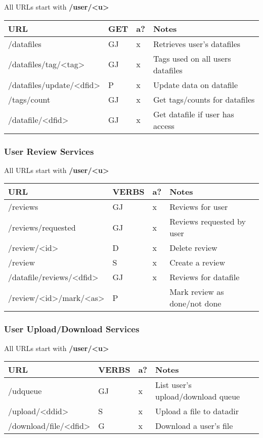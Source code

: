\documentclass[11pt]{article}
\begin{document}
All URLs start with \textbf{/user/<u>}

\begin{center}
\begin{tabular}{llll}
URL & GET & a? & Notes\\
\hline
/datafiles & GJ & x & Retrieves user's datafiles\\
/datafiles/tag/<tag> & GJ & x & Tags used on all users datafiles\\
/datafiles/update/<dfid> & P & x & Update data on datafile\\
/tags/count & GJ & x & Get tags/counts for datafiles\\
/datafile/<dfid> & GJ & x & Get datafile if user has access\\
\end{tabular}
\end{center}

\subsubsection{User Review Services}
\label{sec-1-1-7}

All URLs start with \textbf{/user/<u>}

\begin{center}
\begin{tabular}{llll}
URL & VERBS & a? & Notes\\
\hline
/reviews & GJ & x & Reviews for user\\
/reviews/requested & GJ & x & Reviews requested by user\\
/review/<id> & D & x & Delete review\\
/review & S & x & Create a review\\
/datafile/reviews/<dfid> & GJ & x & Reviews for datafile\\
/review/<id>/mark/<as> & P &  & Mark review as done/not done\\
\end{tabular}
\end{center}
\subsubsection{User Upload/Download Services}
\label{sec-1-1-8}

All URLs start with \textbf{/user/<u>}

\begin{center}
\begin{tabular}{llll}
URL & VERBS & a? & Notes\\
\hline
/udqueue & GJ & x & List user's upload/download queue\\
/upload/<ddid> & S & x & Upload a file to datadir\\
/download/file/<dfid> & G & x & Download a user's file\\
\end{tabular}
\end{center}
\end{document}
